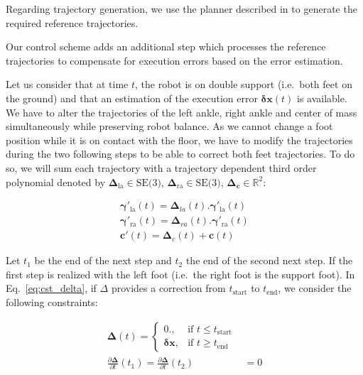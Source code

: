 Regarding trajectory generation, we use the planner described in
\cite{Dalibard11humanoids} to generate the required reference
trajectories.

Our control scheme adds an additional step which processes the
reference trajectories to compensate for execution errors based on the
error estimation.

Let us consider that at time $t$, the robot is on double support
(i.e.\ both feet on the ground) and that an estimation of the
execution error $\mathbf{\delta \mathbf{x}}(t)$ is available. We have
to alter the trajectories of the left ankle, right ankle and center of
mass simultaneously while preserving robot balance. As we cannot
change a foot position while it is on contact with the floor, we have
to modify the trajectories during the two following steps to be able
to correct both feet trajectories. To do so, we will sum each
trajectory with a trajectory dependent third order polynomial denoted
by $\mathbf{\Delta}_{\text{la}} \in \text{SE(3)}$,
$\mathbf{\Delta}_{\text{ra}} \in \text{SE(3)}$,
$\mathbf{\Delta}_{\mathbf{c}} \in \mathbb{R}^2$:

\begin{equation}
  \begin{aligned}
    \mathbf{\gamma}'_{\text{la}}(t) = \mathbf{\Delta}_{la}(t) . \mathbf{\gamma}'_{\text{la}}(t)\\
    \mathbf{\gamma}'_{\text{ra}}(t) = \mathbf{\Delta}_{ra}(t) . \mathbf{\gamma}'_{\text{ra}}(t)\\
    \mathbf{c}'(t) = \mathbf{\Delta}_{c}(t) + \mathbf{c}(t)
  \end{aligned}
  \label{eq:cst_delta}
\end{equation}

Let $t_1$ be the end of the next step and $t_2$ the end of the second
next step. If the first step is realized with the left foot (i.e.\ the
right foot is the support foot). In Eq.~\ref{eq:cst_delta}, if
$\Delta$ provides a correction from $t_{\text{start}}$ to
$t_{\text{end}}$, we consider the following constraints:

\begin{equation}
\begin{aligned}
  \mathbf{\Delta}(t) =
  \begin{cases}
    0.,  & \mbox{if }t\mbox{$\leq t_{\text{start}}$} \\
    \mathbf{\delta x}, & \mbox{if }t\mbox{$\geq t_{\text{end}}$}
  \end{cases}\\
  \frac{\partial \mathbf{\Delta}}{\partial t}(t_1) = \frac{\partial
    \mathbf{\Delta}}{\partial t}(t_2) &= 0
\end{aligned}
\label{eq:deltaConstraints}
\end{equation}

